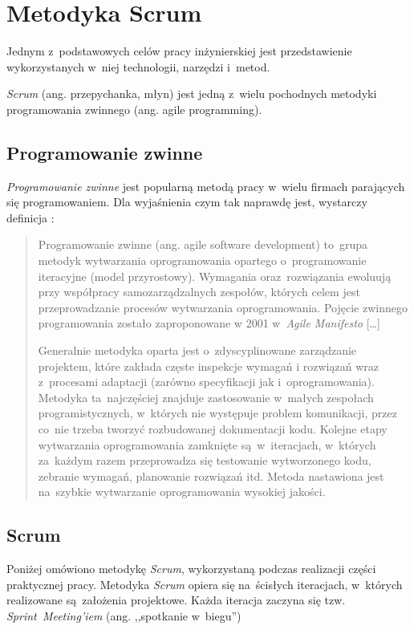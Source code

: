 \section{Metodyka Scrum} \label{scrum}

Jednym z~podstawowych celów pracy inżynierskiej jest przedstawienie wykorzystanych w~niej technologii, narzędzi i~metod.


\textit{Scrum} \cite{scrumaliance} (ang. przepychanka, młyn) jest jedną z~wielu pochodnych metodyki programowania zwinnego \cite{agile1} (ang. agile programming).

\subsection{Programowanie zwinne} \label{scrum.agile}

\textit{Programowanie zwinne} jest popularną metodą pracy w~wielu firmach parających się programowaniem. Dla wyjaśnienia czym tak naprawdę jest, wystarczy definicja \cite{agile2}:

\begin{quote}
Programowanie zwinne (ang. agile software development) to~grupa metodyk wytwarzania oprogramowania opartego o~programowanie iteracyjne (model przyrostowy). Wymagania oraz~rozwiązania ewolu\-ują przy współpracy samozarządzalnych zespołów, których celem jest przeprowadzanie procesów wytwarzania oprogramowania. Pojęcie zwinnego programowania zostało zaproponowane w 2001 w~\textit{Agile Manifesto} \cite{agile.manifesto}
[\ldots]


Generalnie metodyka oparta jest o~zdyscyplinowane zarządzanie projektem, które zakłada częste inspekcje wymagań i rozwiązań wraz z~procesami adaptacji (zarówno specyfikacji jak i~oprogramowania). Metodyka ta~najczęściej znajduje zastosowanie w~małych zespołach programistycznych, w~których nie występuje problem komunikacji, przez co~nie trzeba tworzyć rozbudowanej dokumentacji kodu. Kolejne etapy wytwarzania oprogramowania zamknięte są~w~iteracjach, w~których za~każdym razem przeprowadza się testowanie wytworzonego kodu, zebranie wymagań, planowanie rozwiązań itd. Metoda nastawiona jest na~szybkie wytwarzanie oprogramowania wysokiej jakości.
\end{quote}

\subsection{Scrum} \label{scrum.scrum}

Poniżej omówiono metodykę \textit{Scrum}, wykorzystaną podczas realizacji części praktycznej pracy. Metodyka \textit{Scrum} opiera się na~ścisłych iteracjach, w~których realizowane są~założenia projektowe. Każda iteracja zaczyna się tzw. \textit{Sprint~Meeting'iem} (ang. ,,spotkanie w~biegu'') \cite{scrumaliance}

